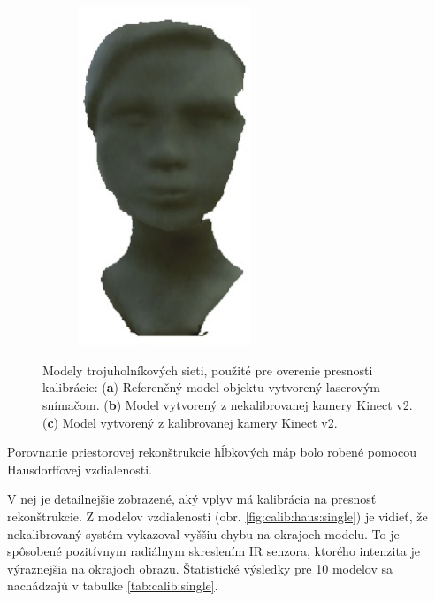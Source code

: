 \begin{figure}[H]
\begin{subfigure}[b]{0.32\textwidth}
		\caption{}
		\label{fig:calib:model:calib}
	\end{subfigure}
	\hskip 3pt 
	\begin{subfigure}[b]{0.32\textwidth}
		\centering
		\includegraphics[width=0.57\textwidth]{figures/calibration_models_uncalib.jpg}
		\caption{}
		\label{fig:calib:model:uncalib}
	\end{subfigure}
	\caption{Modely trojuholníkových sieti, použité pre overenie presnosti kalibrácie: (\textbf{a}) Referenčný model objektu vytvorený laserovým snímačom. (\textbf{b}) Model vytvorený z nekalibrovanej kamery Kinect v2. (\textbf{c}) Model vytvorený z kalibrovanej kamery Kinect v2. }
	\label{fig:calib:models}
\end{figure}


Porovnanie priestorovej rekonštrukcie hĺbkových máp bolo robené pomocou Hausdorffovej vzdialenosti.

V nej je detailnejšie zobrazené, aký vplyv má kalibrácia na presnosť rekonštrukcie. Z modelov vzdialenosti (obr. \ref{fig:calib:haus:single}) je vidieť, že nekalibrovaný systém vykazoval vyššiu chybu na okrajoch modelu. To je spôsobené pozitívnym radiálnym skreslením IR senzora, ktorého intenzita je výraznejšia na okrajoch obrazu. Štatistické výsledky pre 10 modelov sa nachádzajú v tabuľke \ref{tab:calib:single}.

